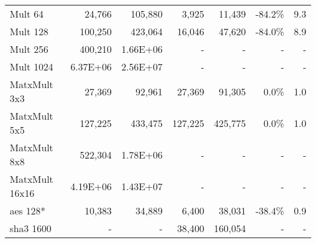 \begin{table}
{\begin{tabular}{l||rr||rr||rr}
Mult 64                   & 24,766                      & 105,880                          & 3,925                       & 11,439                           & -84.2\%                    & 9.3                        \\
Mult 128                  & 100,250                     & 423,064                          & 16,046                      & 47,620                           & -84.0\%                    & 8.9                        \\
Mult 256                  & 400,210                     & 1.66E+06                         & -                           & -                                & -                          & -                          \\
Mult 1024                 & 6.37E+06                    & 2.56E+07                         & -                           & -                                & -                          & -                          \\ \hline
MatxMult 3x3              & 27,369                      & 92,961                           & 27,369                      & 91,305                           & 0.0\%                      & 1.0                        \\
MatxMult 5x5              & 127,225                     & 433,475                          & 127,225                     & 425,775                          & 0.0\%                      & 1.0                        \\
MatxMult 8x8              & 522,304                     & 1.78E+06                         & -                           & -                                & -                          & -                          \\
MatxMult 16x16            & 4.19E+06                    & 1.43E+07                         & -                           & -                                & -                          & -                          \\ \hline
\acrshort{aes} 128*~\cite{mood2016frigate}                  & 10,383                      & 34,889                           & 6,400                       & 38,031                           & -38.4\%                    & 0.9                        \\ \hline
\acrshort{sha}3 1600                 & -                           & -                                & 38,400                      & 160,054                          & -                          & -
\end{tabular}
}
\end{table}

